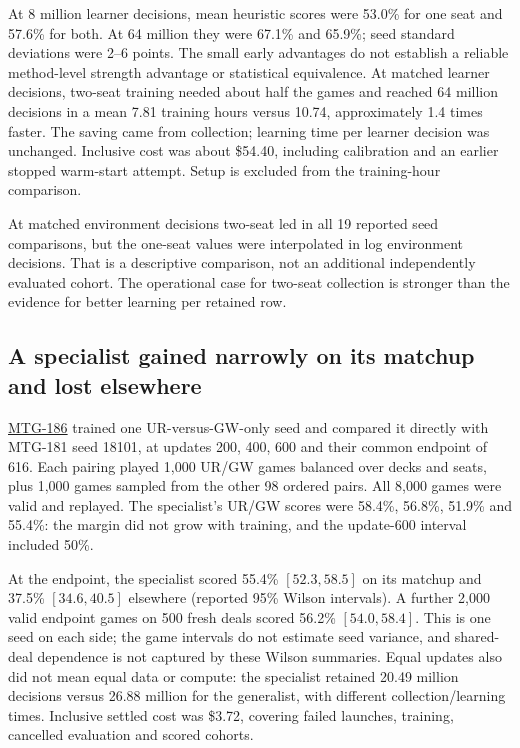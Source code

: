 \documentclass[11pt]{article}
\newcommand{\source}[2]{\href{https://github.com/loopflowstudio/manabot/blob/558e0186b585228dd2130cf14d9cb40de217e66f/#1}{#2}}
\newcommand{\report}[2]{\source{experiments/#1}{#2}}
\begin{document}
At 8 million learner decisions, mean heuristic scores were 53.0\% for one seat and 57.6\% for both. At 64 million they were 67.1\% and 65.9\%; seed standard deviations were 2--6 points. The small early advantages do not establish a reliable method-level strength advantage or statistical equivalence. At matched learner decisions, two-seat training needed about half the games and reached 64 million decisions in a mean 7.81 training hours versus 10.74, approximately 1.4 times faster. The saving came from collection; learning time per learner decision was unchanged. Inclusive cost was about \$54.40, including calibration and an earlier stopped warm-start attempt. Setup is excluded from the training-hour comparison.

At matched environment decisions two-seat led in all 19 reported seed comparisons, but the one-seat values were interpolated in log environment decisions. That is a descriptive comparison, not an additional independently evaluated cohort. The operational case for two-seat collection is stronger than the evidence for better learning per retained row.

\subsection{A specialist gained narrowly on its matchup and lost elsewhere}

\report{protocols/mtg186.md}{MTG-186} trained one UR-versus-GW-only seed and compared it directly with MTG-181 seed 18101, at updates 200, 400, 600 and their common endpoint of 616. Each pairing played 1,000 UR/GW games balanced over decks and seats, plus 1,000 games sampled from the other 98 ordered pairs. All 8,000 games were valid and replayed. The specialist's UR/GW scores were 58.4\%, 56.8\%, 51.9\% and 55.4\%: the margin did not grow with training, and the update-600 interval included 50\%.

At the endpoint, the specialist scored 55.4\% $[52.3,58.5]$ on its matchup and 37.5\% $[34.6,40.5]$ elsewhere (reported 95\% Wilson intervals). A further 2,000 valid endpoint games on 500 fresh deals scored 56.2\% $[54.0,58.4]$. This is one seed on each side; the game intervals do not estimate seed variance, and shared-deal dependence is not captured by these Wilson summaries. Equal updates also did not mean equal data or compute: the specialist retained 20.49 million decisions versus 26.88 million for the generalist, with different collection/learning times. Inclusive settled cost was \$3.72, covering failed launches, training, cancelled evaluation and scored cohorts.
\end{document}
